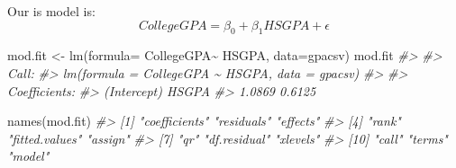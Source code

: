 \documentclass[
]{book}
\newenvironment{Shaded}{\begin{snugshade}}{\end{snugshade}}
\newcommand{\AttributeTok}[1]{\textcolor[rgb]{0.77,0.63,0.00}{#1}}
\newcommand{\CommentTok}[1]{\textcolor[rgb]{0.56,0.35,0.01}{\textit{#1}}}
\newcommand{\DecValTok}[1]{\textcolor[rgb]{0.00,0.00,0.81}{#1}}
\newcommand{\FunctionTok}[1]{\textcolor[rgb]{0.00,0.00,0.00}{#1}}
\newcommand{\NormalTok}[1]{#1}
\newcommand{\OtherTok}[1]{\textcolor[rgb]{0.56,0.35,0.01}{#1}}
\newcommand{\SpecialCharTok}[1]{\textcolor[rgb]{0.00,0.00,0.00}{#1}}
\begin{document}
Our is model is:\[CollegeGPA=\beta_0+\beta_1HSGPA+\epsilon\]

\begin{Shaded}
\begin{Highlighting}[]
\NormalTok{mod.fit }\OtherTok{\textless{}{-}} \FunctionTok{lm}\NormalTok{(}\AttributeTok{formula=}\NormalTok{ CollegeGPA}\SpecialCharTok{\textasciitilde{}}\NormalTok{ HSGPA, }\AttributeTok{data=}\NormalTok{gpacsv)}
\NormalTok{mod.fit}
\CommentTok{\#\textgreater{} }
\CommentTok{\#\textgreater{} Call:}
\CommentTok{\#\textgreater{} lm(formula = CollegeGPA \textasciitilde{} HSGPA, data = gpacsv)}
\CommentTok{\#\textgreater{} }
\CommentTok{\#\textgreater{} Coefficients:}
\CommentTok{\#\textgreater{} (Intercept)        HSGPA  }
\CommentTok{\#\textgreater{}      1.0869       0.6125}
\end{Highlighting}
\end{Shaded}

\begin{Shaded}
\begin{Highlighting}[]
\FunctionTok{names}\NormalTok{(mod.fit)}
\CommentTok{\#\textgreater{}  [1] "coefficients"  "residuals"     "effects"      }
\CommentTok{\#\textgreater{}  [4] "rank"          "fitted.values" "assign"       }
\CommentTok{\#\textgreater{}  [7] "qr"            "df.residual"   "xlevels"      }
\CommentTok{\#\textgreater{} [10] "call"          "terms"         "model"}
\end{Highlighting}
\end{Shaded}

\begin{Shaded}
\end{Shaded}

\begin{Shaded}
\end{Shaded}
\end{document}
